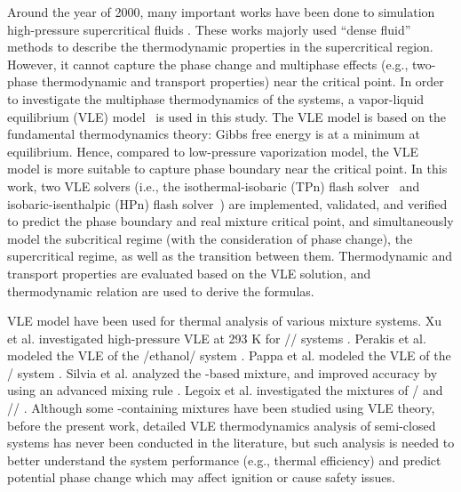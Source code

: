 Around the year of 2000, many important works have been done to simulation high-pressure supercritical fluids \cite{oefelein2005thermophysical,bellan2000supercritical,yang2000modeling}. These works majorly used ``dense fluid'' methods to describe the thermodynamic properties in the supercritical region. However, it cannot capture the phase change and multiphase effects (e.g., two-phase thermodynamic and transport properties) near the critical point.
In order to investigate the multiphase thermodynamics of the  systems, a vapor-liquid equilibrium (VLE) model~\cite{michelsen1982isothermal,michelsen1987multiphase} is used in this study. The VLE model is based on the fundamental thermodynamics theory: Gibbs free energy is at a minimum at equilibrium. Hence, compared to low-pressure vaporization model, the VLE model is more suitable to capture phase boundary near the critical point. In this work, two VLE solvers (i.e., the isothermal-isobaric (TPn) flash solver~\cite{michelsen1982isothermal} and isobaric-isenthalpic (HPn) flash solver~\cite{michelsen1987multiphase}) are implemented, validated, and verified to predict the phase boundary and real mixture critical point, and simultaneously model the subcritical regime (with the consideration of phase change), the supercritical regime, as well as the transition between them. Thermodynamic and transport properties are evaluated based on the VLE solution, and thermodynamic relation are used to derive the formulas.

VLE model have been used for thermal analysis of various mixture systems. Xu et al. investigated high-pressure VLE at 293 K for // systems \cite{xu1992high}. Perakis et al. modeled the VLE of the /ethanol/ system \cite{perakis2006thermodynamic}. Pappa et al. modeled the VLE of the / system \cite{pappa2009thermodynamic}. Silvia et al. analyzed the -based mixture, and improved accuracy by using an advanced mixing rule \cite{lasala2016vle}. Legoix et al. investigated the mixtures of / and // \cite{legoix2017phase}. Although some -containing mixtures have been studied using VLE theory, before the present work, detailed VLE thermodynamics analysis of semi-closed  systems has never been conducted in the literature, but such analysis is needed to better understand the  system performance (e.g., thermal efficiency) and predict potential phase change which may affect ignition or cause safety issues.

